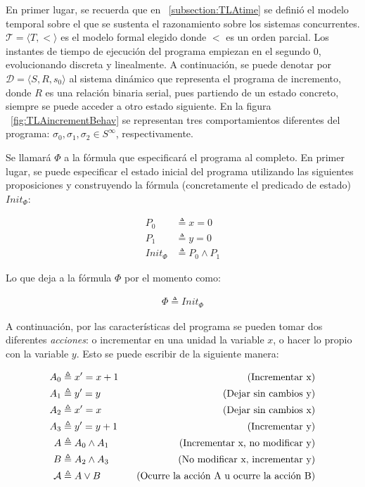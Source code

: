 En primer lugar, se recuerda que en ~\ref{subsection:TLAtime} se definió el modelo temporal sobre el que se sustenta el razonamiento sobre los sistemas concurrentes. $\mathcal{T} = \langle T, < \rangle$ es el modelo formal elegido donde $<$ es un orden parcial. Los instantes de tiempo de ejecución del programa empiezan en el segundo $0$, evolucionando discreta y linealmente. A continuación, se puede denotar por $\mathcal{D} = \langle S, R, s_0 \rangle$ al sistema dinámico que representa el programa de incremento, donde $R$ es una relación binaria serial, pues partiendo de un estado concreto, siempre se puede acceder a otro estado siguiente. En la figura ~\ref{fig:TLAincrementBehav} se representan tres comportamientos diferentes del programa: $\sigma_0, \sigma_1, \sigma_2 \in S^\infty$, respectivamente.

Se llamará $\Phi$ a la fórmula que especificará el programa al completo. En primer lugar, se puede especificar el estado inicial del programa utilizando las siguientes proposiciones y construyendo la fórmula (concretamente el predicado de estado) $Init_{\Phi}$:

\begin{align*}
    P_0 &\triangleq x = 0 \\
    P_1 &\triangleq y = 0 \\
    Init_{\Phi} &\triangleq P_0 \land P_1
\end{align*}

\noindent
Lo que deja a la fórmula $\Phi$ por el momento como:

\begin{align*}
    \Phi \triangleq Init_{\Phi}
\end{align*}

A continuación, por las características del programa se pueden tomar dos diferentes \textit{acciones}: o incrementar en una unidad la variable $x$, o hacer lo propio con la variable $y$. Esto se puede escribir de la siguiente manera:

\begin{align*}
    A_0 &\triangleq x' = x+1 \hspace{0.3cm} &\text{(Incrementar x)} \\
    A_1 &\triangleq y' = y \hspace{0.3cm} &\text{(Dejar sin cambios y)}\\
    A_2 &\triangleq x' = x \hspace{0.3cm} &\text{(Dejar sin cambios x)} \\
    A_3 &\triangleq y' = y+1 \hspace{0.3cm} &\text{(Incrementar y)} \\
    A &\triangleq A_0 \land A_1 \hspace{0.3cm} &\text{(Incrementar x, no modificar y)} \\
    B &\triangleq A_2 \land A_3 \hspace{0.3cm} &\text{(No modificar x, incrementar y)} \\
    \mathcal{A} &\triangleq A \lor B \hspace{0.3cm} &\text{(Ocurre la acción A u ocurre la acción B)}
\end{align*}


